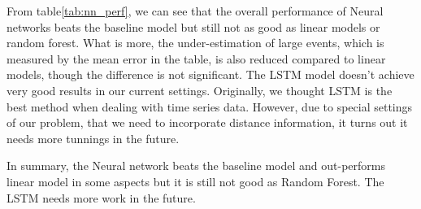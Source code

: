 \documentclass{article} %
\begin{document}
From table\ref{tab:nn_perf}, we can see that the overall performance of Neural networks beats the baseline model but still not as good as linear models or random forest. What is more, the under-estimation of large events, which is measured by the mean error in the table, is also reduced compared to linear models, though the difference is not significant. The LSTM model doesn't achieve very good results in our current settings. Originally, we thought LSTM is the best method when dealing with time series data. However, due to special settings of our problem, that we need to incorporate distance information, it turns out it needs more tunnings in the future.

In summary, the Neural network beats the baseline model and out-performs linear model in some aspects but it is still not good as Random Forest.  The LSTM needs more work in the future.
\end{document}
